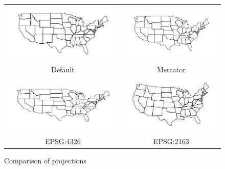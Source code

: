 \documentclass{article}
\begin{document}
\begin{figure}[htbp]
  \centering
  \begin{tabular}{cc}
    \includegraphics[scale=0.9]{prj0.pdf} &
     \includegraphics[scale=0.9]{mercator.pdf} \\[-6pt]
    \small{Default} & \small{Mercator} \\
    \includegraphics[scale=0.9]{epsg4326.pdf} &
      \includegraphics[scale=0.9]{epsg2163.pdf} \\[-6pt]
    \small{EPSG:4326} & \small{EPSG:2163}
  \end{tabular}
  \vspace{1ex}
  \caption{Comparison of projections}
  \label{fig:proj}
\end{figure}
\end{document}
